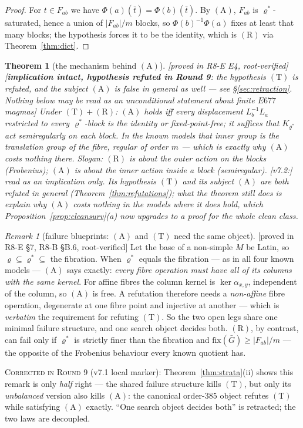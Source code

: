 \documentclass[11pt]{article}
\theoremstyle{plain}
\newtheorem{theorem}{Theorem}[section]
\theoremstyle{definition}
\theoremstyle{remark}
\newtheorem*{remark*}{Remark}
\numberwithin{equation}{section}
\newcommand{\statusbox}[1]{{\small\sloppy\textsf{[#1]}}}
\newcommand{\PROVED}[1]{\statusbox{proved in #1, root-verified}}
\newcommand{\COMP}[1]{\statusbox{computational: #1}}
\newcommand{\HYPDEAD}[1]{\statusbox{\textbf{implication intact, hypothesis
refuted in Round 9}: #1 --- see \S\ref{sec:retraction}. Nothing below may be read
as an unconditional statement about finite $E677$ magmas}}
\begin{document}
\begin{proof}
For $t\in F_{ab}$ we have $\Phi(a)(\bar t) = \Phi(b)(\bar t)$. By $(\mathrm{A})$,
$F_{ab}$ is $\varrho^{*}$-saturated, hence a union of $|F_{ab}|/m$ blocks, so
$\Phi(b)^{-1}\Phi(a)$ fixes at least that many blocks; the hypothesis forces it to
be the identity, which is $(\mathrm{R})$ via Theorem~\ref{thm:dict}.
\end{proof}

\begin{theorem}[the mechanism behind $(\mathrm{A})$]\label{thm:Amech}
\PROVED{R8-E E4}\;\COMP{$0/2541$ and $0/14520$ partial fixed sets}\;%
\HYPDEAD{the hypothesis $(\mathrm{T})$ is refuted, and the subject
$(\mathrm{A})$ is false in general as well}
Under $(\mathrm{T})+(\mathrm{R})$: $(\mathrm{A})$ holds iff every displacement
$L_b^{-1}L_a$ restricted to every $\varrho^{*}$-block is the identity or
fixed-point-free; it suffices that $K_{\varrho^{*}}$ act \emph{semiregularly} on
each block. In the known models that inner group is the translation group of the
fibre, regular of order $m$ --- which is exactly why $(\mathrm{A})$ costs nothing
there. Slogan: \emph{$(\mathrm{R})$ is about the outer action on the blocks
(Frobenius); $(\mathrm{A})$ is about the inner action inside a block
(semiregular)}. [v7.2:] read as an implication only. Its hypothesis
$(\mathrm{T})$ and its subject $(\mathrm{A})$ are both refuted in general
(Theorem~\ref{thm:refutations}); what the theorem still does is explain why
$(\mathrm{A})$ costs nothing in the models where it does hold, which
Proposition~\ref{prop:cleansurv}(a) now upgrades to a proof for the whole clean
class.
\end{theorem}

\begin{remark*}[failure blueprints: $(\mathrm{A})$ and $(\mathrm{T})$ need the
same object]
\PROVED{R8-E \S7, R8-B \S B.6}
Let the base of a non-simple $M$ be Latin, so $\varrho\subseteq\varrho^{*}\subseteq$
the fibration. When $\varrho^{*}$ equals the fibration --- as in all four known
models --- $(\mathrm{A})$ says exactly: \emph{every fibre operation must have all
of its columns with the same kernel}. For affine fibres the column kernel is
$\ker\alpha_{x,y}$, independent of the column, so $(\mathrm{A})$ is free. A
refutation therefore needs a \emph{non-affine} fibre operation, degenerate at one
fibre point and injective at another --- which is \emph{verbatim} the requirement
for refuting $(\mathrm{T})$. So the two open legs share one minimal failure
structure, and one search object decides both. $(\mathrm{R})$, by contrast, can
fail only if $\varrho^{*}$ is strictly finer than the fibration and
$\mathrm{fix}(\bar G)\ge|F_{ab}|/m$ --- the opposite of the Frobenius behaviour
every known quotient has.

\textsc{Corrected in Round 9} (v7.1 local marker): Theorem~\ref{thm:strata}(ii)
shows this remark is only \emph{half} right --- the shared failure structure
kills $(\mathrm{T})$, but only its \emph{unbalanced} version also kills
$(\mathrm{A})$: the canonical order-$385$ object refutes $(\mathrm{T})$ while
satisfying $(\mathrm{A})$ exactly. ``One search object decides both'' is
retracted; the two laws are decoupled.
\end{remark*}
\end{document}
